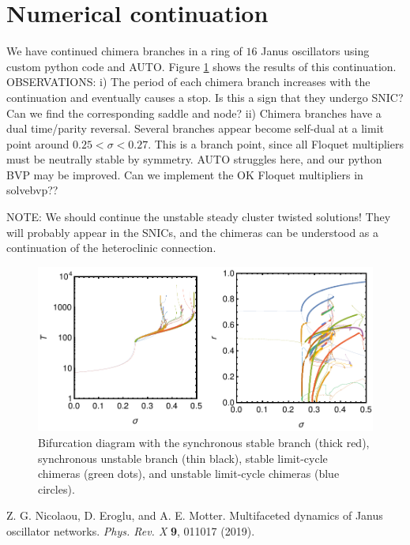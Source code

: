 \documentclass[aps,pre,amsmath,amssymb,floatfix,onecolumn,notitlepage,10pt]{revtex4-1}
\begin{document}
\section{Numerical continuation}
We have continued chimera branches in a ring of $16$ Janus oscillators using custom python code and AUTO. Figure \ref{fig1} shows the results of this continuation. OBSERVATIONS: i) The period of each chimera branch increases with the continuation and eventually causes a stop. Is this a sign that they undergo SNIC? Can we find the corresponding saddle and node? ii) Chimera branches have a dual time/parity reversal. Several branches appear become self-dual at a limit point around $0.25<\sigma<0.27$. This is a branch point, since all Floquet multipliers must be neutrally stable by symmetry. AUTO struggles here, and our python BVP may be improved. Can we implement the OK Floquet multipliers in solvebvp??

NOTE: We should continue the unstable steady cluster twisted solutions! They will probably appear in the SNICs, and the chimeras can be understood as a continuation of the heteroclinic connection.

\begin{figure}[hb]
\includegraphics[width=\columnwidth]{diagram.pdf}
\caption{Bifurcation diagram with the synchronous stable branch (thick red), synchronous unstable branch (thin black), stable limit-cycle chimeras (green dots), and unstable limit-cycle chimeras (blue circles). \label{fig1}}
\end{figure}
\begin{thebibliography}{99}
 Z. G. Nicolaou, D. Eroglu, and A. E. Motter. Multifaceted dynamics of Janus oscillator networks. \textit{Phys. Rev. X} \textbf{9}, 011017 (2019).
\end{thebibliography}
\end{document}
